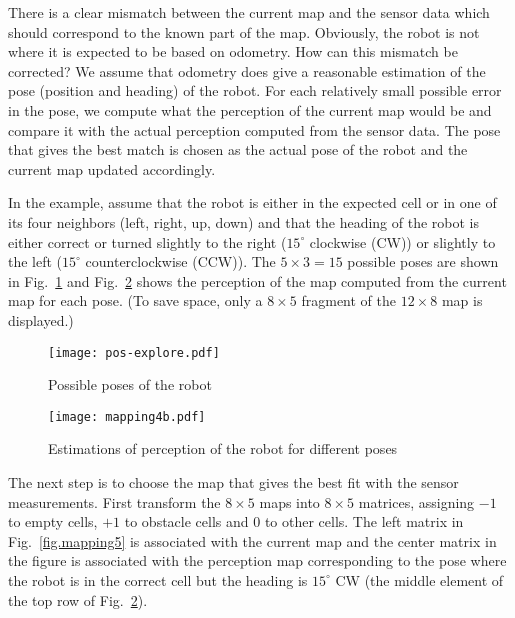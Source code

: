 There is a clear mismatch between the current map and the sensor data which should correspond to the known part of the map. Obviously, the robot is not where it is expected to be based on odometry. How can this mismatch be corrected? We assume that odometry does give a reasonable estimation of the pose (position and heading) of the robot. For each relatively small possible error in the pose, we compute what the perception of the current map would be and compare it with the actual perception computed from the sensor data. The pose that gives the best match is chosen as the actual pose of the robot and the current map updated accordingly.

In the example, assume that the robot is either in the expected cell or in one of its four neighbors (left, right, up, down) and that the heading of the robot is either correct or turned slightly to the right ($15^\circ$ clockwise (CW)) or slightly to the left ($15^\circ$  counterclockwise (CCW)). The $5\times 3=15$ possible poses are shown in Fig.~\ref{fig.pos-explore} and Fig.~\ref{fig.mapping4} shows the perception of the map computed from the current map for each pose. (To save space, only a $8\times 5$ fragment of the $12\times 8$ map is displayed.)

\begin{figure}
\begin{center}
\texttt{[image: pos-explore.pdf]}
\end{center}
\caption{Possible poses of the robot}\label{fig.pos-explore}
\end{figure}

\begin{figure}
\begin{center}
\texttt{[image: mapping4b.pdf]}
\end{center}
\caption{Estimations of perception of the robot for different poses}\label{fig.mapping4}
\end{figure}

The next step is to choose the map that gives the best fit with the sensor measurements. First transform the $8\times 5$ maps into $8\times 5$ matrices, assigning $-1$ to empty cells, $+1$ to obstacle cells and $0$ to other cells. The left matrix in Fig.~\ref{fig.mapping5} is associated with the current map and the center matrix in the figure is associated with the perception map corresponding to the pose where the robot is in the correct cell but the heading is $15^\circ$ CW (the middle element of the top row of Fig.~\ref{fig.mapping4}).

